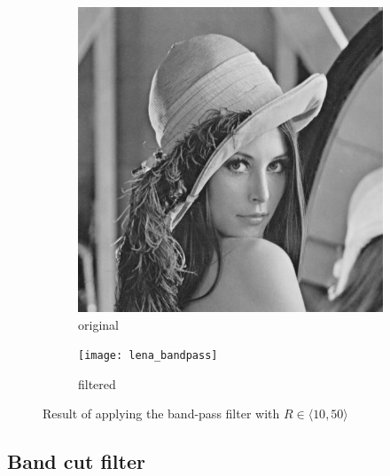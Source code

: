 \documentclass[12pt]{article}
\renewcommand*{\subfiguresize}{.35\textwidth}
\begin{document}
\begin{figure}[H]\centering
    \begin{subfigure}[ht]{\subfiguresize}
        \includegraphics[width=\textwidth]{lena}
        \caption{original}
    \end{subfigure}
    \hspace*{2em}
    \begin{subfigure}[ht]{\subfiguresize}
        \texttt{[image: lena\_bandpass]}
        \caption{filtered}
    \end{subfigure}
    \caption{Result of applying the band-pass filter with $R \in \langle 10, 50 \rangle$}
\end{figure}

\subsection{Band cut filter}
\end{document}
